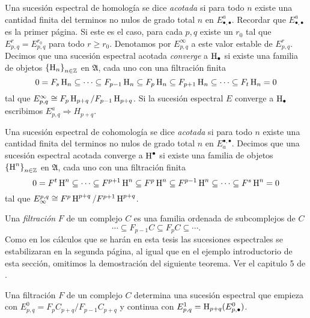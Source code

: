 \documentclass[a4paper,oneside,fleqn,11pt,../tesis.tex]{subfiles}
\begin{document}
\begin{definition}
    Una sucesión espectral de homología  se dice \emph{acotada} si para todo $n$ existe una cantidad finita del terminos no nulos de grado total
    $n$ en $E^{a}_{\bullet,\bullet}$. Recordar que $E^{a}_{\bullet,\bullet}$ es la primer página. Si este es el caso, para cada $p, q$ existe 
    un $r_0$ tal que $E_{p, q}^{r} = E_{p, q}^{r_0}$ para todo $r \geq r_0$.
    Denotamos por $E_{p, q}^{\infty}$ a este valor estable de $E_{p, q}^{r}$. Decimos que una sucesión espectral acotada \emph{converge}
    a $\operatorname{H}_{\bullet}$ si existe una familia de objetos $\left\lbrace \operatorname{H}_{n} \right\rbrace_{n \in \mathbb{Z}}$ en $\mathfrak{A}$, cada uno con una
    filtración finita
    \[
        0 = F_s \operatorname{H}_n \subseteq \cdots \subseteq F_{p - 1}\operatorname{H}_n \subseteq
            F_{p}\operatorname{H}_n \subseteq F_{p + 1}\operatorname{H}_n \subseteq \cdots \subseteq F_t \operatorname{H}_n = 0
    \]
    tal que $E_{p, q}^{\infty} \cong F_{p}\operatorname{H}_{p + q} / F_{p - 1} \operatorname{H}_{p + q}$. Si la sucesión espectral $E$ converge a $\operatorname{H}_{\bullet}$
    escribimos $E_{p, q}^{a} \Rightarrow H_{p + q}$.
    
    Una sucesión espectral de cohomología  se dice \emph{acotada} si para todo $n$ existe una cantidad finita del terminos no nulos de grado total
    $n$ en $E_{a}^{\bullet,\bullet}$. Decimos que una sucesión espectral acotada converge a $\operatorname{H}^{\bullet}$ si existe una familia de objetos 
    $\left\lbrace \operatorname{H}^{n} \right\rbrace_{n \in \mathbb{Z}}$ en $\mathfrak{A}$, cada uno con una
    filtración finita
    \[
        0 = F^t \operatorname{H}^n \subseteq \cdots \subseteq F^{p + 1}\operatorname{H}^n \subseteq
            F^{p}\operatorname{H}^n \subseteq F^{p - 1}\operatorname{H}^n \subseteq \cdots \subseteq F^s \operatorname{H}^n = 0
    \]
    tal que $E^{p, q}_{\infty} \cong F^{p}\operatorname{H}^{p + q} / F^{p + 1} \operatorname{H}^{p + q}$.
\end{definition}


Una \emph{filtración} $F$ de un complejo $C$ es una familia ordenada de subcomplejos de  $C$
\[
        \cdots \subseteq F_{p - 1}C \subseteq F_{p}C \subseteq \cdots .
\]
Como en los cálculos que se harán en esta
tesis las sucesiones espectrales se estabilizaran en la segunda página, al igual que en el ejemplo introductorio de esta sección,
omitimos la demostración del siguiente teorema. Ver el capitulo 5 de \myworries{[W]}.

\begin{Teorema} Una filtración $F$ de un complejo $C$ determina una sucesión espectral que empieza con
$E_{p, q}^{0} = F_{p} C_{p + q} / F_{p - 1}C_{p + q}$ y continua con $E_{p, q}^{1} = \operatorname{H}_{p + q}(E_{p, \bullet}^{0})$.
\end{Teorema}
\end{document}
